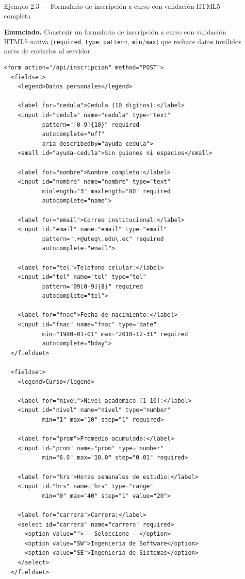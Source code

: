 \begin{cajaejemplo}{Ejemplo 2.3 --- Formulario de inscripción a curso con validación HTML5 completa}

\textbf{Enunciado.} Construir un formulario de inscripción a curso con validación HTML5 nativa (\texttt{required}, \texttt{type}, \texttt{pattern}, \texttt{min}/\texttt{max}) que rechace datos inválidos antes de enviarlos al servidor.

\begin{lstlisting}[style=html,caption={inscripcion.html (formulario funcional)},label=lst:2.6]
<form action="/api/inscripcion" method="POST">
  <fieldset>
    <legend>Datos personales</legend>

    <label for="cedula">Cedula (10 digitos):</label>
    <input id="cedula" name="cedula" type="text"
           pattern="[0-9]{10}" required
           autocomplete="off"
           aria-describedby="ayuda-cedula">
    <small id="ayuda-cedula">Sin guiones ni espacios</small>

    <label for="nombre">Nombre completo:</label>
    <input id="nombre" name="nombre" type="text"
           minlength="3" maxlength="80" required
           autocomplete="name">

    <label for="email">Correo institucional:</label>
    <input id="email" name="email" type="email"
           pattern=".+@uteq\.edu\.ec" required
           autocomplete="email">

    <label for="tel">Telefono celular:</label>
    <input id="tel" name="tel" type="tel"
           pattern="09[0-9]{8}" required
           autocomplete="tel">

    <label for="fnac">Fecha de nacimiento:</label>
    <input id="fnac" name="fnac" type="date"
           min="1980-01-01" max="2010-12-31" required
           autocomplete="bday">
  </fieldset>

  <fieldset>
    <legend>Curso</legend>

    <label for="nivel">Nivel academico (1-10):</label>
    <input id="nivel" name="nivel" type="number"
           min="1" max="10" step="1" required>

    <label for="prom">Promedio acumulado:</label>
    <input id="prom" name="prom" type="number"
           min="6.0" max="10.0" step="0.01" required>

    <label for="hrs">Horas semanales de estudio:</label>
    <input id="hrs" name="hrs" type="range"
           min="0" max="40" step="1" value="20">

    <label for="carrera">Carrera:</label>
    <select id="carrera" name="carrera" required>
      <option value="">-- Seleccione --</option>
      <option value="SW">Ingenieria de Software</option>
      <option value="SE">Ingenieria de Sistemas</option>
    </select>
  </fieldset>


\end{lstlisting}
\end{cajaejemplo}
